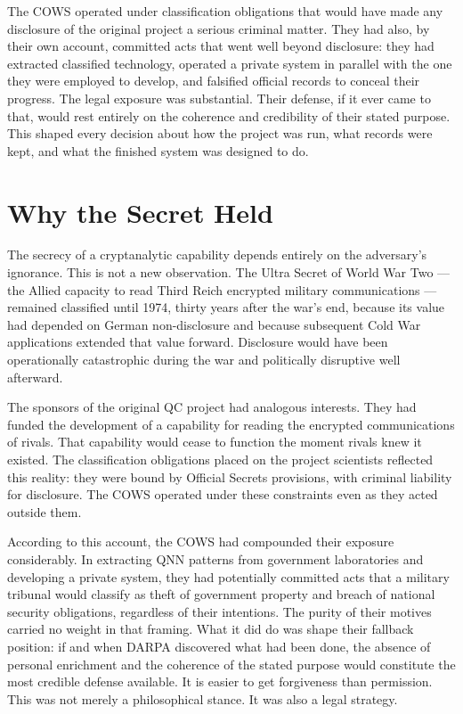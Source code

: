 The COWS operated under classification obligations that would have made any disclosure of the original project a serious criminal matter. They had also, by their own account, committed acts that went well beyond disclosure: they had extracted classified technology, operated a private system in parallel with the one they were employed to develop, and falsified official records to conceal their progress. The legal exposure was substantial. Their defense, if it ever came to that, would rest entirely on the coherence and credibility of their stated purpose. This shaped every decision about how the project was run, what records were kept, and what the finished system was designed to do.

\section*{Why the Secret Held}
\label{record:int-why-the-secret-held}

The secrecy of a cryptanalytic capability depends entirely on the adversary's ignorance. This is not a new observation. The Ultra Secret of World War Two --- the Allied capacity to read Third Reich encrypted military communications --- remained classified until 1974, thirty years after the war's end, because its value had depended on German non-disclosure and because subsequent Cold War applications extended that value forward. Disclosure would have been operationally catastrophic during the war and politically disruptive well afterward.

The sponsors of the original QC project had analogous interests. They had funded the development of a capability for reading the encrypted communications of rivals. That capability would cease to function the moment rivals knew it existed. The classification obligations placed on the project scientists reflected this reality: they were bound by Official Secrets provisions, with criminal liability for disclosure. The COWS operated under these constraints even as they acted outside them.

According to this account, the COWS had compounded their exposure considerably. In extracting QNN patterns from government laboratories and developing a private system, they had potentially committed acts that a military tribunal would classify as theft of government property and breach of national security obligations, regardless of their intentions. The purity of their motives carried no weight in that framing. What it did do was shape their fallback position: if and when DARPA discovered what had been done, the absence of personal enrichment and the coherence of the stated purpose would constitute the most credible defense available. It is easier to get forgiveness than permission. This was not merely a philosophical stance. It was also a legal strategy.

